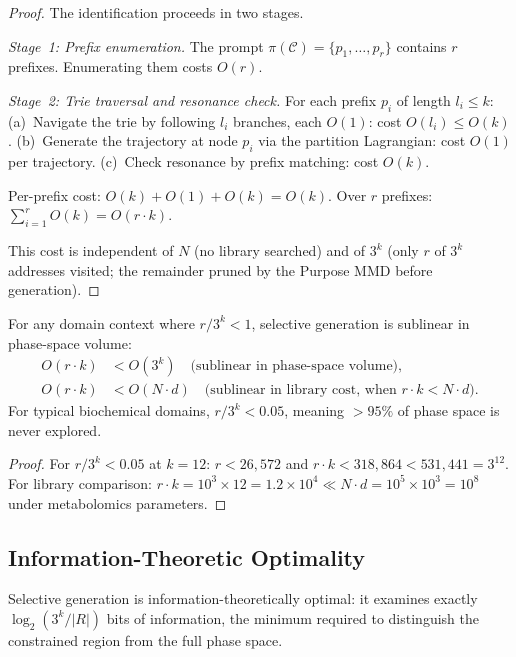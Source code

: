 \begin{proof}
The identification proceeds in two stages.

\emph{Stage~1: Prefix enumeration.}  The prompt $\pi(\mathcal{C}) = \{p_1, \ldots,
p_r\}$ contains $r$ prefixes.  Enumerating them costs $O(r)$.

\emph{Stage~2: Trie traversal and resonance check.}  For each prefix $p_i$
of length $l_i \leq k$:
(a)~Navigate the trie by following $l_i$ branches, each $O(1)$: cost $O(l_i)
\leq O(k)$.
(b)~Generate the trajectory at node $p_i$ via the partition Lagrangian:
cost $O(1)$ per trajectory.
(c)~Check resonance by prefix matching: cost $O(k)$.

Per-prefix cost: $O(k) + O(1) + O(k) = O(k)$.  Over $r$ prefixes:
$\sum_{i=1}^r O(k) = O(r \cdot k)$.

This cost is independent of $N$ (no library searched) and of $3^k$ (only $r$
of $3^k$ addresses visited; the remainder pruned by the Purpose MMD before
generation).
\end{proof}

\begin{theorem}
\label{thm:ch24-sublinear}
For any domain context where $r/3^k < 1$, selective generation is sublinear
in phase-space volume:
\begin{align}
  O(r \cdot k) &< O(3^k)
  \quad \text{(sublinear in phase-space volume)}, \\
  O(r \cdot k) &< O(N \cdot d)
  \quad \text{(sublinear in library cost, when } r \cdot k < N \cdot d\text{)}.
\end{align}
For typical biochemical domains, $r/3^k < 0.05$, meaning $> 95\%$ of phase
space is never explored.
\end{theorem}

\begin{proof}
For $r/3^k < 0.05$ at $k = 12$: $r < 26{,}572$ and
$r \cdot k < 318{,}864 < 531{,}441 = 3^{12}$.
For library comparison: $r \cdot k = 10^3 \times 12 = 1.2 \times 10^4 \ll
N \cdot d = 10^5 \times 10^3 = 10^8$ under metabolomics parameters.
\end{proof}

\subsection{Information-Theoretic Optimality}
\label{sec:ch24-optimality}

\begin{theorem}[Optimality]
\label{thm:ch24-optimal}
Selective generation is information-theoretically optimal: it examines exactly
$\log_2(3^k/|R|)$ bits of information, the minimum required to distinguish the
constrained region from the full phase space.
\end{theorem}

